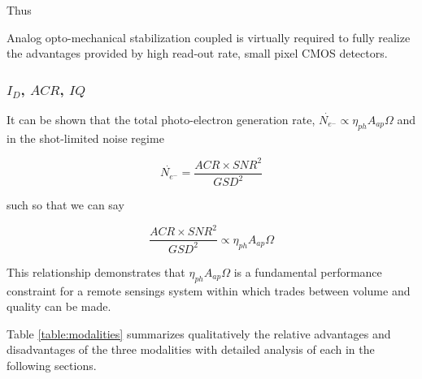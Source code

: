 \documentclass[10pt,journal]{IEEEtran}  %
\begin{document}
Thus

\begin{observation}
Analog opto-mechanical stabilization coupled is virtually required to fully realize the advantages provided by high read-out rate, small pixel CMOS detectors.
\end{observation}

\subsubsection{$I_{D}$, $ACR$, $IQ$}

It can be shown that the total photo-electron generation rate, $\dot{N_{e^-}} \propto \eta_{ph}A_{ap}\Omega$ and in the shot-limited noise regime

\begin{equation}
    \dot{N_{e^-}} = \frac{ACR \times SNR^2}{GSD^2}
\end{equation}

such so that we can say

\begin{equation}
    \frac{ACR \times SNR^2}{GSD^2} \propto \eta_{ph}A_{ap}\Omega
\end{equation}

This relationship demonstrates that $\eta_{ph}A_{ap}\Omega$ is a fundamental performance constraint for a remote sensings system within which trades between volume and quality can be made.

Table \ref{table:modalities} summarizes qualitatively the relative advantages and disadvantages of the three modalities with detailed analysis of each in the following sections.
\end{document}
